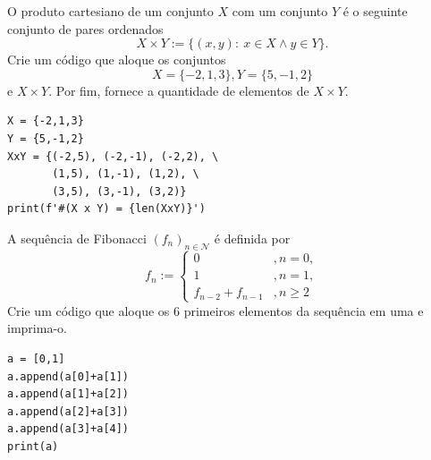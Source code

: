 \begin{exer}
  O produto cartesiano{\descartes} de um conjunto $X$ com um conjunto $Y$ é o seguinte conjunto de pares ordenados
  \begin{equation}
    X\times Y := \{(x,y):~x\in X \land y\in Y\}.
  \end{equation}
  Crie um código que aloque os conjuntos
  \begin{equation}
    X = \{-2,1,3\},
    Y = \{5,-1,2\}
  \end{equation}
  e $X\times Y$. Por fim, fornece a quantidade de elementos de $X\times Y$.
\end{exer}
\begin{resp}

\begin{lstlisting}
X = {-2,1,3}
Y = {5,-1,2}
XxY = {(-2,5), (-2,-1), (-2,2), \
       (1,5), (1,-1), (1,2), \
       (3,5), (3,-1), (3,2)}
print(f'#(X x Y) = {len(XxY)}')
\end{lstlisting}

\end{resp}

\begin{exer}
  A sequência de Fibonacci{\fibonacci} $(f_n)_{n\in\mathcal{N}}$ é definida por
  \begin{equation}
    f_n := \left\{
    \begin{array}{ll}
      0 &, n=0,\\
      1 &, n=1,\\
      f_{n-2}+f_{n-1} &, n\geq 2
    \end{array}
  \right. 
\end{equation}
Crie um código que aloque os $6$ primeiros elementos da sequência em uma {\PYTHONlist} e imprima-o.
\end{exer}
\begin{resp}

\begin{lstlisting}
a = [0,1]
a.append(a[0]+a[1])
a.append(a[1]+a[2])
a.append(a[2]+a[3])
a.append(a[3]+a[4])
print(a)
\end{lstlisting}

\end{resp}

